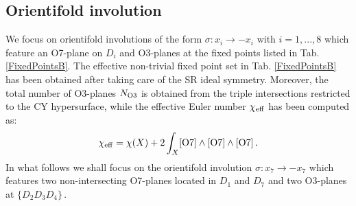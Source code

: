 \documentclass[11pt,a4paper]{article}
\newcommand{\be}{\begin{equation}}
\newcommand{\ee}{\end{equation}}
\begin{document}
\begin{table}[htb]
\centering
{}
\caption{Volumes of intersection curves between two coordinate divisors.}
\label{IntersectB}
\end{table}

\subsection{Orientifold involution}

We focus on orientifold involutions of the form $\sigma: x_i \to - x_i$ with $i = 1, ...,8$  which feature an O7-plane on $D_i$ and O3-planes at the fixed points listed in Tab. \ref{FixedPointsB}. The effective non-trivial fixed point set in Tab. \ref{FixedPointsB} has been obtained after taking care of
the SR ideal symmetry. Moreover, the total number of O3-planes $N_{\rm O3}$ is obtained from the triple intersections restricted to the CY hypersurface, while the effective Euler number $\chi_{\rm eff}$ has been computed as:
\be
\chi_{\rm eff} = \chi(X) +2\int_X [{\rm O7}] \wedge [{\rm O7}] \wedge [{\rm O7}]\,.
\ee
In what follows we shall focus on the orientifold involution $\sigma: x_7\rightarrow-x_7$ which features two non-intersecting O7-planes located in $D_1$ and $D_7$ and two O3-planes at $\{D_2D_3D_4\}$\,.
\end{document}
